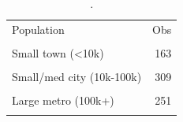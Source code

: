 \begin{table}[htbp]\centering
\caption{.}
\label{tab:bin_counts_population3_2020}
\begin{tabular}{lr}\toprule
Population & Obs \\\\ \midrule
Small town (<10k) & 163 \\\\
Small/med city (10k-100k) & 309 \\\\
Large metro (100k+) & 251 \\\\
\bottomrule\end{tabular}\end{table}
